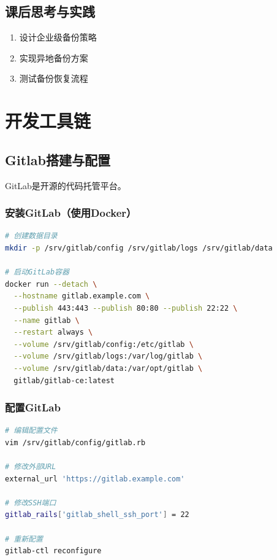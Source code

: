 \documentclass[12pt,UTF8]{ctexbook}
\begin{document}
\section{课后思考与实践}
\label{sec:backup-practice}
\begin{enumerate}
    \item 设计企业级备份策略
    \item 实现异地备份方案
    \item 测试备份恢复流程
\end{enumerate}

\chapter{开发工具链}
\label{chap:dev-tools}

\section{Gitlab搭建与配置}
\label{sec:gitlab}

GitLab是开源的代码托管平台。

\subsection*{安装GitLab（使用Docker）}
\begin{lstlisting}[language=bash]
# 创建数据目录
mkdir -p /srv/gitlab/config /srv/gitlab/logs /srv/gitlab/data

# 启动GitLab容器
docker run --detach \
  --hostname gitlab.example.com \
  --publish 443:443 --publish 80:80 --publish 22:22 \
  --name gitlab \
  --restart always \
  --volume /srv/gitlab/config:/etc/gitlab \
  --volume /srv/gitlab/logs:/var/log/gitlab \
  --volume /srv/gitlab/data:/var/opt/gitlab \
  gitlab/gitlab-ce:latest
\end{lstlisting}

\subsection*{配置GitLab}
\begin{lstlisting}[language=bash]
# 编辑配置文件
vim /srv/gitlab/config/gitlab.rb

# 修改外部URL
external_url 'https://gitlab.example.com'

# 修改SSH端口
gitlab_rails['gitlab_shell_ssh_port'] = 22

# 重新配置
gitlab-ctl reconfigure
\end{lstlisting}
\end{document}
